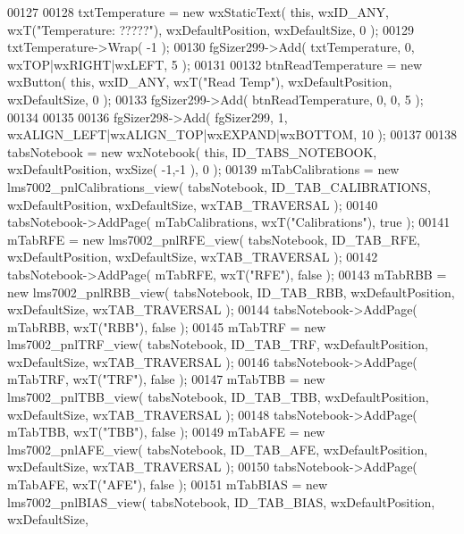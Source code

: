 \begin{DoxyCode}
00127     
00128     txtTemperature = \textcolor{keyword}{new} wxStaticText( \textcolor{keyword}{this}, wxID\_ANY, wxT(\textcolor{stringliteral}{"Temperature: ?????"}), wxDefaultPosition, 
      wxDefaultSize, 0 );
00129     txtTemperature->Wrap( -1 );
00130     fgSizer299->Add( txtTemperature, 0, wxTOP|wxRIGHT|wxLEFT, 5 );
00131     
00132     btnReadTemperature = \textcolor{keyword}{new} wxButton( \textcolor{keyword}{this}, wxID\_ANY, wxT(\textcolor{stringliteral}{"Read Temp"}), wxDefaultPosition, wxDefaultSize, 
      0 );
00133     fgSizer299->Add( btnReadTemperature, 0, 0, 5 );
00134     
00135     
00136     fgSizer298->Add( fgSizer299, 1, wxALIGN\_LEFT|wxALIGN\_TOP|wxEXPAND|wxBOTTOM, 10 );
00137     
00138     tabsNotebook = \textcolor{keyword}{new} wxNotebook( \textcolor{keyword}{this}, ID_TABS_NOTEBOOK, wxDefaultPosition, wxSize( -1,-1 ), 0 );
00139     mTabCalibrations = \textcolor{keyword}{new} lms7002_pnlCalibrations_view( tabsNotebook, 
      ID_TAB_CALIBRATIONS, wxDefaultPosition, wxDefaultSize, wxTAB\_TRAVERSAL );
00140     tabsNotebook->AddPage( mTabCalibrations, wxT(\textcolor{stringliteral}{"Calibrations"}), \textcolor{keyword}{true} );
00141     mTabRFE = \textcolor{keyword}{new} lms7002_pnlRFE_view( tabsNotebook, ID_TAB_RFE, wxDefaultPosition, wxDefaultSize, 
      wxTAB\_TRAVERSAL );
00142     tabsNotebook->AddPage( mTabRFE, wxT(\textcolor{stringliteral}{"RFE"}), \textcolor{keyword}{false} );
00143     mTabRBB = \textcolor{keyword}{new} lms7002_pnlRBB_view( tabsNotebook, ID_TAB_RBB, wxDefaultPosition, wxDefaultSize, 
      wxTAB\_TRAVERSAL );
00144     tabsNotebook->AddPage( mTabRBB, wxT(\textcolor{stringliteral}{"RBB"}), \textcolor{keyword}{false} );
00145     mTabTRF = \textcolor{keyword}{new} lms7002_pnlTRF_view( tabsNotebook, ID_TAB_TRF, wxDefaultPosition, wxDefaultSize, 
      wxTAB\_TRAVERSAL );
00146     tabsNotebook->AddPage( mTabTRF, wxT(\textcolor{stringliteral}{"TRF"}), \textcolor{keyword}{false} );
00147     mTabTBB = \textcolor{keyword}{new} lms7002_pnlTBB_view( tabsNotebook, ID_TAB_TBB, wxDefaultPosition, wxDefaultSize, 
      wxTAB\_TRAVERSAL );
00148     tabsNotebook->AddPage( mTabTBB, wxT(\textcolor{stringliteral}{"TBB"}), \textcolor{keyword}{false} );
00149     mTabAFE = \textcolor{keyword}{new} lms7002_pnlAFE_view( tabsNotebook, ID_TAB_AFE, wxDefaultPosition, wxDefaultSize, 
      wxTAB\_TRAVERSAL );
00150     tabsNotebook->AddPage( mTabAFE, wxT(\textcolor{stringliteral}{"AFE"}), \textcolor{keyword}{false} );
00151     mTabBIAS = \textcolor{keyword}{new} lms7002_pnlBIAS_view( tabsNotebook, ID_TAB_BIAS, wxDefaultPosition, wxDefaultSize, 

\end{DoxyCode}
